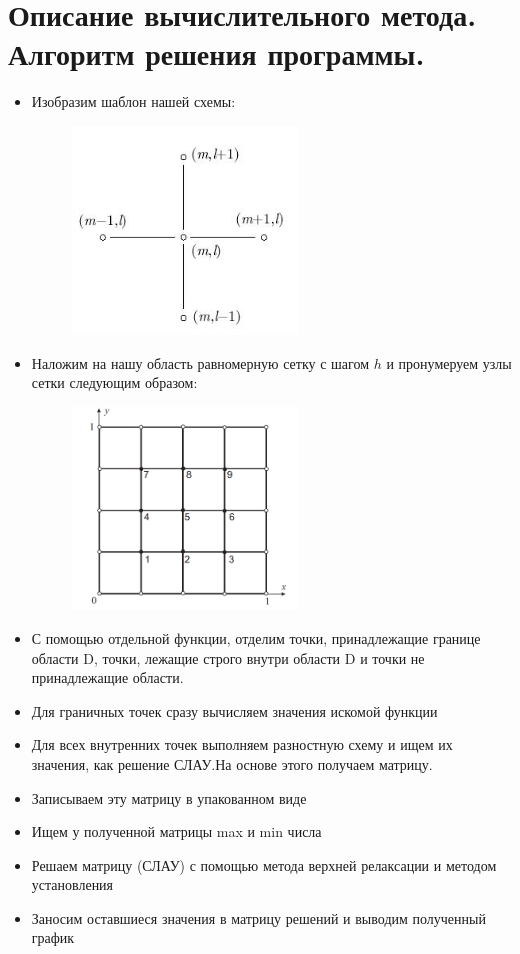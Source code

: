 \documentclass[12pt,a4paper]{scrartcl}
\begin{document}
\newpage

\section{Описание вычислительного метода. Алгоритм решения программы.}
\begin{itemize}
	\item Изобразим шаблон нашей схемы:
	\begin{figure}[h]
		\centering
		\includegraphics[width=6cm]{img/scheme.jpg}
	\end{figure}
	\item Наложим на нашу область равномерную сетку с шагом $h$     и пронумеруем узлы сетки следующим образом:
	\begin{figure}[h]
		\centering
		\includegraphics[width=6cm]{img/normal.png}
	\end{figure}
	\item С помощью отдельной функции, отделим точки, принадлежащие границе области D, точки, лежащие строго внутри области D и точки не принадлежащие области.  
	\item Для граничных точек сразу вычисляем значения искомой функции
	\item Для всех внутренних точек выполняем разностную схему и ищем их значения, как решение СЛАУ.На основе этого получаем матрицу.
	\item Записываем эту матрицу в упакованном виде
	\item Ищем у полученной матрицы max и min числа
	\item Решаем матрицу (СЛАУ) с помощью метода верхней релаксации и методом установления
	\item Заносим оставшиеся значения в матрицу решений и выводим полученный график
\end{itemize} 
\end{document}
